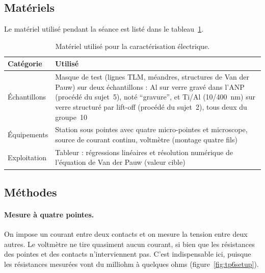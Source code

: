 \subsection{Matériels}
Le matériel utilisé pendant la séance est listé dans le tableau~\ref{tab:s6-materiel}.
\begin{table}[H]
  \centering\small
  \caption{Matériel utilisé pour la caractérisation électrique.}
  \label{tab:s6-materiel}
  \begin{tabularx}{\linewidth}{@{}lX@{}}
    \toprule
    \textbf{Catégorie} & \textbf{Utilisé} \\
    \midrule
    Échantillons & Masque de test (lignes TLM, méandres, structures de Van der Pauw) sur deux échantillons : Al sur verre gravé dans l'ANP (procédé du sujet~5), noté \enquote{gravure}, et Ti/Al (10/\qty{400}{\nano\metre}) sur verre structuré par lift-off (procédé du sujet~2), tous deux du groupe~10 \\
    Équipements  & Station sous pointes avec quatre micro-pointes et microscope, source de courant continu, voltmètre (montage quatre fils) \\
    Exploitation & Tableur : régressions linéaires et résolution numérique de l'équation de Van der Pauw (valeur cible) \\
    \bottomrule
  \end{tabularx}
\end{table}

\subsection{Méthodes}

\paragraph{Mesure à quatre pointes.}
On impose un courant entre deux contacts et on mesure la tension entre deux autres. Le voltmètre ne tire quasiment aucun courant, si bien que les résistances des pointes et des contacts n'interviennent pas. C'est indispensable ici, puisque les résistances mesurées vont du milliohm à quelques ohms (figure~\ref{fig:tp6setup}).

